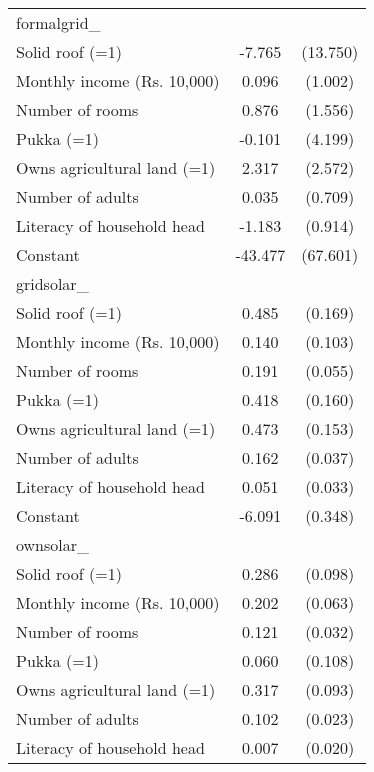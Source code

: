 \begin{table}[htbp]
\begin{tabular}{l*{1}{cc}}
\midrule
formalgrid\_         &                     &            \\
Solid roof (=1)     &      -7.765         &    (13.750)\\
Monthly income (Rs. 10,000)&       0.096         &     (1.002)\\
Number of rooms     &       0.876         &     (1.556)\\
Pukka (=1)          &      -0.101         &     (4.199)\\
Owns agricultural land (=1)&       2.317         &     (2.572)\\
Number of adults    &       0.035         &     (0.709)\\
Literacy of household head&      -1.183         &     (0.914)\\
Constant            &     -43.477         &    (67.601)\\
\midrule
gridsolar\_          &                     &            \\
Solid roof (=1)     &       0.485\sym{***}&     (0.169)\\
Monthly income (Rs. 10,000)&       0.140         &     (0.103)\\
Number of rooms     &       0.191\sym{***}&     (0.055)\\
Pukka (=1)          &       0.418\sym{***}&     (0.160)\\
Owns agricultural land (=1)&       0.473\sym{***}&     (0.153)\\
Number of adults    &       0.162\sym{***}&     (0.037)\\
Literacy of household head&       0.051         &     (0.033)\\
Constant            &      -6.091\sym{***}&     (0.348)\\
\midrule
ownsolar\_           &                     &            \\
Solid roof (=1)     &       0.286\sym{***}&     (0.098)\\
Monthly income (Rs. 10,000)&       0.202\sym{***}&     (0.063)\\
Number of rooms     &       0.121\sym{***}&     (0.032)\\
Pukka (=1)          &       0.060         &     (0.108)\\
Owns agricultural land (=1)&       0.317\sym{***}&     (0.093)\\
Number of adults    &       0.102\sym{***}&     (0.023)\\
Literacy of household head&       0.007         &     (0.020)\\

\end{tabular}
\end{table}
